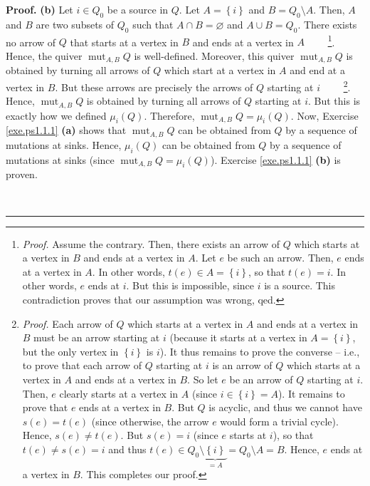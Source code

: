 \documentclass[numbers=enddot,12pt,final,onecolumn,notitlepage]{scrartcl}%
\numberwithin{exer}{section}
\theoremstyle{definition}
\newenvironment{proof}[1][Proof]{\noindent\textbf{#1.} }{\ \rule{0.5em}{0.5em}}
\begin{document}
\begin{proof}
\textbf{(b)} Let $i\in Q_{0}$ be a source in $Q$. Let $A=\left\{  i\right\}  $
and $B=Q_{0}\setminus A$. Then, $A$ and $B$ are two subsets of $Q_{0}$ such
that $A\cap B=\varnothing$ and $A\cup B=Q_{0}$. There exists no arrow of $Q$
that starts at a vertex in $B$ and ends at a vertex in $A$%
\ \ \ \ \footnote{\textit{Proof.} Assume the contrary. Then, there exists an
arrow of $Q$ which starts at a vertex in $B$ and ends at a vertex in $A$. Let
$e$ be such an arrow. Then, $e$ ends at a vertex in $A$. In other words,
$t\left(  e\right)  \in A=\left\{  i\right\}  $, so that $t\left(  e\right)
=i$. In other words, $e$ ends at $i$. But this is impossible, since $i$ is a
source. This contradiction proves that our assumption was wrong, qed.}. Hence,
the quiver $\operatorname*{mut}\nolimits_{A,B}Q$ is well-defined. Moreover,
this quiver $\operatorname*{mut}\nolimits_{A,B}Q$ is obtained by turning all
arrows of $Q$ which start at a vertex in $A$ and end at a vertex in $B$. But
these arrows are precisely the arrows of $Q$ starting at $i$%
\ \ \ \ \footnote{\textit{Proof.} Each arrow of $Q$ which starts at a vertex
in $A$ and ends at a vertex in $B$ must be an arrow starting at $i$ (because
it starts at a vertex in $A=\left\{  i\right\}  $, but the only vertex in
$\left\{  i\right\}  $ is $i$). It thus remains to prove the converse -- i.e.,
to prove that each arrow of $Q$ starting at $i$ is an arrow of $Q$ which
starts at a vertex in $A$ and ends at a vertex in $B$. So let $e$ be an arrow
of $Q$ starting at $i$. Then, $e$ clearly starts at a vertex in $A$ (since
$i\in\left\{  i\right\}  =A$). It remains to prove that $e$ ends at a vertex
in $B$. But $Q$ is acyclic, and thus we cannot have $s\left(  e\right)
=t\left(  e\right)  $ (since otherwise, the arrow $e$ would form a trivial
cycle). Hence, $s\left(  e\right)  \neq t\left(  e\right)  $. But $s\left(
e\right)  =i$ (since $e$ starts at $i$), so that $t\left(  e\right)  \neq
s\left(  e\right)  =i$ and thus $t\left(  e\right)  \in Q_{0}\setminus
\underbrace{\left\{  i\right\}  }_{=A}=Q_{0}\setminus A=B$. Hence, $e$ ends at
a vertex in $B$. This completes our proof.}. Hence, $\operatorname*{mut}%
\nolimits_{A,B}Q$ is obtained by turning all arrows of $Q$ starting at $i$.
But this is exactly how we defined $\mu_{i}\left(  Q\right)  $. Therefore,
$\operatorname*{mut}\nolimits_{A,B}Q=\mu_{i}\left(  Q\right)  $. Now, Exercise
\ref{exe.ps1.1.1} \textbf{(a)} shows that $\operatorname*{mut}\nolimits_{A,B}%
Q$ can be obtained from $Q$ by a sequence of mutations at sinks. Hence,
$\mu_{i}\left(  Q\right)  $ can be obtained from $Q$ by a sequence of
mutations at sinks (since $\operatorname*{mut}\nolimits_{A,B}Q=\mu_{i}\left(
Q\right)  $). Exercise \ref{exe.ps1.1.1} \textbf{(b)} is proven. \medskip


\end{proof}
\end{document}

